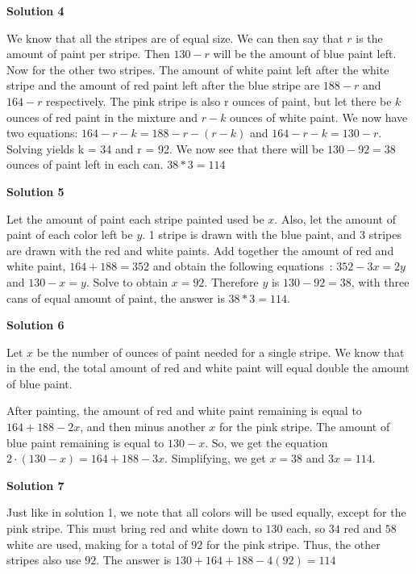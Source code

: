 \begin{enumerate}
 



\textbf{Solution 4}

We know that all the stripes are of equal size. We can then say that $r$ is the amount of paint per stripe. Then $130 - r$ will be the amount of blue paint left. Now for the other two stripes. The amount of white paint left after the white stripe and the amount of red paint left after the blue stripe are $188 - r$ and $164 - r$ respectively. The pink stripe is also r ounces of paint, but let there be $k$ ounces of red paint in the mixture and $r - k$ ounces of white paint. We now have two equations: $164 - r - k = 188 - r - (r-k)$ and $164 - r -  k = 130 - r$. Solving yields k = 34 and r = 92. We now see that there will be $130 - 92 = 38$ ounces of paint left in each can. $38 * 3 = \boxed{114}$




\textbf{Solution 5}

Let the amount of paint each stripe painted used be $x$. Also, let the amount of paint of each color left be $y$. 1 stripe is drawn with the blue paint, and 3 stripes are drawn with the red and white paints. Add together the amount of red and white paint, $164 + 188 = 352$ and obtain the following equations : $352 - 3x = 2y$ and $130 - x = y$. Solve to obtain $x = 92$. Therefore $y$ is $130 - 92 = 38$, with three cans of equal amount of paint, the answer is $38 * 3 = \boxed{114}$.

 



\textbf{Solution 6}

Let $x$ be the number of ounces of paint needed for a single stripe. We know that in the end, the total amount of red and white paint will equal double the amount of blue paint.

 After painting, the amount of red and white paint remaining is equal to $164+188-2x$, and then minus another $x$ for the pink stripe. The amount of blue paint remaining is equal to $130-x$. So, we get the equation $2\cdot(130-x)=164+188-3x$. Simplifying, we get $x=38$ and $3x=\boxed{114}$.

 



\textbf{Solution 7}

Just like in solution 1, we note that all colors will be used equally, except for the pink stripe. This must bring red and white down to $130$ each, so $34$ red and $58$ white are used, making for a total of $92$ for the pink stripe. Thus, the other stripes also use $92$. The answer is $130+164+188-4(92)=\boxed{114}$




\end{enumerate}
